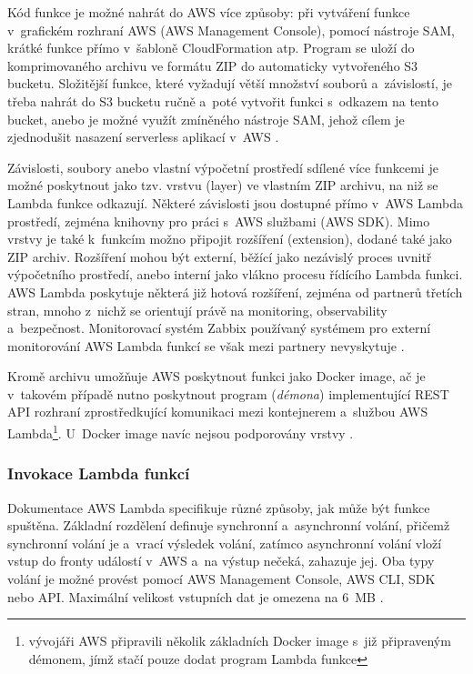 \documentclass[czech, ing, kiv, he, iso690]{fasthesis}
\begin{document}
Kód funkce je možné nahrát do AWS více způsoby: při vytváření funkce v~grafickém rozhraní AWS (AWS Management Console), pomocí nástroje SAM, krátké funkce přímo v~šabloně CloudFormation atp. Program se uloží do komprimovaného archivu ve formátu ZIP do automaticky vytvořeného S3 bucketu. Složitější funkce, které vyžadují větší množství souborů a~závislostí, je třeba nahrát do S3 bucketu ručně a~poté vytvořit funkci s~odkazem na tento bucket, anebo je možné využít zmíněného nástroje SAM, jehož cílem je zjednodušit nasazení serverless aplikací v~AWS \cite{sam.docs.aws, lambda.docs.aws}. 

Závislosti, soubory anebo vlastní výpočetní prostředí sdílené více funkcemi je možné poskytnout jako tzv. vrstvu (layer) ve vlastním ZIP archivu, na niž se Lambda funkce odkazují. Některé závislosti jsou dostupné přímo v~AWS Lambda prostředí, zejména knihovny pro práci s~AWS službami (AWS SDK). Mimo vrstvy je také k~funkcím možno připojit rozšíření (extension), dodané také jako ZIP archiv. Rozšíření mohou být externí, běžící jako nezávislý proces uvnitř výpočetního prostředí, anebo interní jako vlákno procesu řídícího Lambda funkci. AWS Lambda poskytuje některá již hotová rozšíření, zejména od partnerů třetích stran, mnoho z~nichž se orientují právě na monitoring, observability a~bezpečnost. Monitorovací systém Zabbix používaný systémem pro externí monitorování AWS Lambda funkcí se však mezi partnery nevyskytuje \cite{lambda.docs.aws}.

Kromě archivu umožňuje AWS poskytnout funkci jako Docker image, ač je v~takovém případě nutno poskytnout program (\emph{démona}) implementující REST API rozhraní zprostředkující komunikaci mezi kontejnerem a~službou AWS Lambda\footnote{vývojáři AWS připravili několik základních Docker image s~již připraveným démonem, jímž stačí pouze dodat program Lambda funkce}. U~Docker image navíc nejsou podporovány vrstvy \cite{lambda.docs.aws}.

\subsubsection{Invokace Lambda funkcí}
Dokumentace AWS Lambda specifikuje různé způsoby, jak může být funkce spuštěna. Základní rozdělení definuje synchronní a~asynchronní volání, přičemž synchronní volání je  a~vrací výsledek volání, zatímco asynchronní volání vloží vstup do fronty událostí v~AWS a~na výstup nečeká, zahazuje jej. Oba typy volání je možné provést pomocí AWS Management Console, AWS CLI, SDK nebo API. Maximální velikost vstupních dat je omezena na 6~MB \cite{lambda.docs.aws}.
\end{document}
